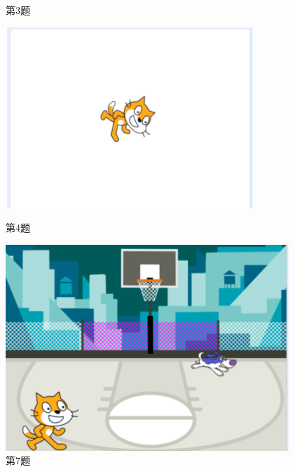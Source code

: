 \documentclass[10pt, a4paper]{article}
\begin{document}
\begin{enumerate}
\begin{figure}[htbp]
\begin{minipage}[t]{.09\textwidth}
                \caption*{第3题}
            \end{minipage}
            \begin{minipage}[t]{.2\textwidth}
                \centering
                \includegraphics[width=\textwidth]{4.png}
                \caption*{第4题}
            \end{minipage}
            \begin{minipage}[t]{.2\textwidth}
                \centering
                \includegraphics[width=\textwidth]{7.png}
                \caption*{第7题}
            \end{minipage}
        \end{figure}


\end{enumerate}
\end{document}
